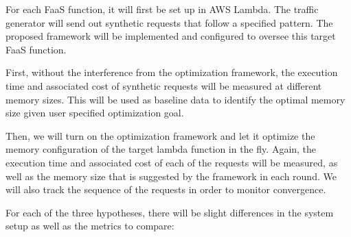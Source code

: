 \documentclass[conference]{IEEEtran}
\begin{document}
For each FaaS function, it will first be set up in AWS Lambda. The traffic generator will send out synthetic requests that follow a specified pattern. The proposed framework will be implemented and configured to oversee this target FaaS function. 

First, without the interference from the optimization framework, the execution time and associated cost of synthetic requests will be measured at different memory sizes. This will be used as baseline data to identify the optimal memory size given user specified optimization goal.

Then, we will turn on the optimization framework and let it optimize the memory configuration of the target lambda function in the fly. Again, the execution time and associated cost of each of the requests will be measured, as well as the memory size that is suggested by the framework in each round. We will also track the sequence of the requests in order to monitor convergence.

For each of the three hypotheses, there will be slight differences in the system setup as well as the metrics to compare:
\end{document}
